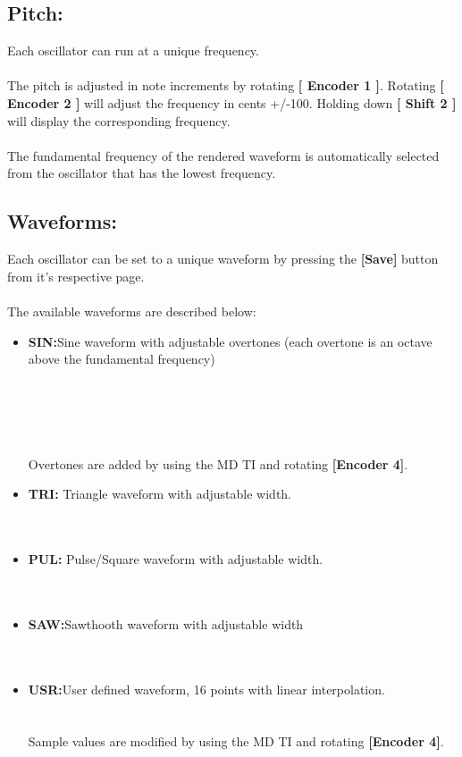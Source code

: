 \subsection{Pitch:}
Each oscillator can run at a unique frequency.\\
\\The pitch is adjusted in note increments by rotating \textbf{[ Encoder 1 ]}. Rotating \textbf{[ Encoder 2 ]} will adjust the frequency in cents +/-100. Holding down \textbf{[ Shift 2 ]} will display the corresponding frequency.\\
\\The fundamental frequency of the rendered waveform is automatically selected from the oscillator that has the lowest frequency.
\subsection{Waveforms:}
Each oscillator can be set to a unique waveform by pressing the \textbf{[Save]} button from it's respective page.\\
\\
The available waveforms are described below:

\begin{itemize}
\item{\textbf{SIN:}}Sine waveform with adjustable overtones (each overtone is an octave above the fundamental frequency)\\
\\\\
\\\\
\\Overtones are added by using the MD TI and rotating \textbf{[Encoder 4]}.
\item{\textbf{TRI:}} Triangle waveform with adjustable width.\\
\\\\
\item{\textbf{PUL:}} Pulse/Square waveform with adjustable width.\\
\\\\
\item{\textbf{SAW:}}Sawthooth waveform with adjustable width\\
\\\\
\item{\textbf{USR:}}User defined waveform, 16 points with linear interpolation.\\
\\\\
Sample values are modified by using the MD TI and rotating \textbf{[Encoder 4]}.
\end{itemize}
